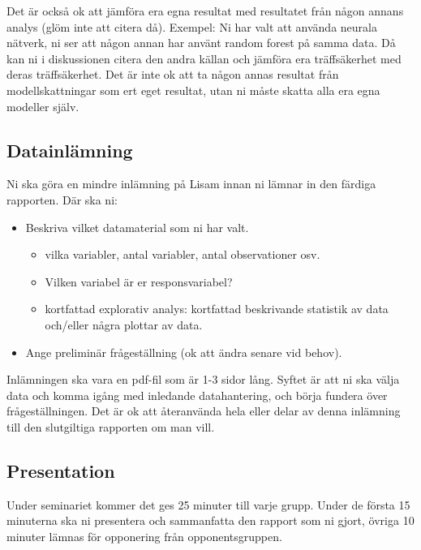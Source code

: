 \documentclass[a4paper]{article}
\begin{document}
Det är också ok att jämföra era egna resultat med resultatet från någon annans analys (glöm inte att citera då). Exempel: Ni har valt att använda neurala nätverk, ni ser att någon annan har använt random forest på samma data. Då kan ni i diskussionen citera den andra källan och jämföra era träffsäkerhet med deras träffsäkerhet. Det är inte ok att ta någon annas resultat från modellskattningar som ert eget resultat, utan ni måste skatta alla era egna modeller själv.

\subsection*{Datainlämning}
Ni ska göra en mindre inlämning på Lisam innan ni lämnar in den färdiga rapporten. Där ska ni:
\begin{itemize}
    \item Beskriva vilket datamaterial som ni har valt.
    \begin{itemize}
        \item vilka variabler, antal variabler, antal observationer osv.
        \item Vilken variabel är er responsvariabel? 
        \item kortfattad explorativ analys: kortfattad beskrivande statistik av data och/eller några plottar av data.
    \end{itemize}
    \item Ange preliminär frågeställning (ok att ändra senare vid behov).
\end{itemize}
Inlämningen ska vara en pdf-fil som är 1-3 sidor lång. Syftet är att ni ska välja data och komma igång med inledande datahantering, och börja fundera över frågeställningen. Det är ok att återanvända hela eller delar av denna inlämning till den slutgiltiga rapporten om man vill.

\subsection*{Presentation}
Under seminariet kommer det ges 25 minuter till varje grupp. Under de första 15 
minuterna ska ni presentera och sammanfatta den rapport som ni gjort, övriga 10 
minuter lämnas för opponering från opponentsgruppen.
\end{document}
